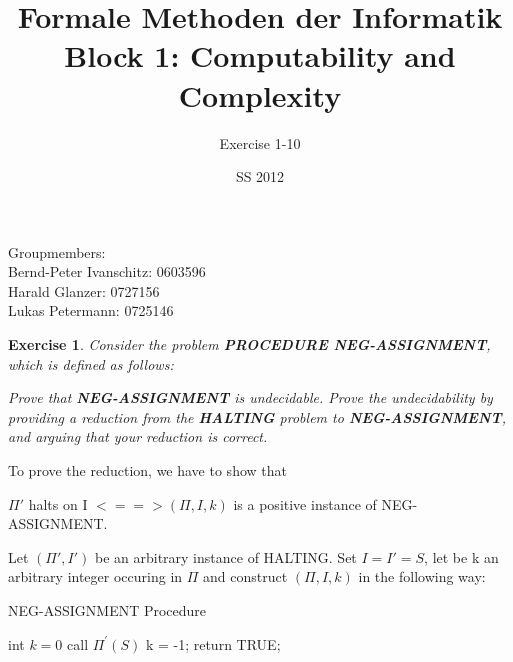\documentclass [11pt]{article}
\title{Formale Methoden der Informatik \\
Block 1: Computability and Complexity }
\author{Exercise 1-10}
\date{SS 2012}
\newtheorem{exercise}[theorem]{Exercise}
\newcommand{\solution}[1]{\noindent {\bf Solution.}  #1}
\begin{document}
\maketitle
\begin {center}
Groupmembers:\\
Bernd-Peter Ivanschitz: 0603596\\
Harald Glanzer: 0727156\\
Lukas Petermann: 0725146\\

\end{center}

\begin{exercise}
  Consider the problem \textbf{PROCEDURE NEG-ASSIGNMENT}, which is defined
  as follows:

  \begin{center}
  \end{center}
  Prove that \textbf{NEG-ASSIGNMENT} is undecidable. Prove the undecidability
  by providing a reduction from the \textbf{HALTING} problem to
  \textbf{NEG-ASSIGNMENT}, and arguing that your reduction is correct.
\end{exercise}


\solution

To prove the reduction, we have to show that 

\bigskip

$\Pi'$ halts on I $<==>(\Pi, I, k)$ is a positive instance of NEG-ASSIGNMENT.

\bigskip

Let $(\Pi', I') $ be an arbitrary instance of HALTING.  Set $I = I' = S $, let be k an arbitrary integer occuring in $\Pi$ and  construct $(\Pi, I, k) $ in the following way: 

\smallskip


\begin{algorithm}
\caption{NEG-ASSIGNMENT Procedure}
\label{<your label for references later in your document>}
\begin{algorithmic}

 \State int $k = 0$
 \State call $\Pi^\prime(S)$
 \State k = -1;
 \State return TRUE;
\EndFunction

\end{algorithmic}
\end{algorithm}
\end{document}
